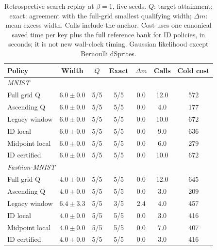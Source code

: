 \begin{table}[H]
\caption{Retrospective search replay at $\beta=1$, five seeds. $Q$: target attainment; exact: agreement with the full-grid smallest qualifying width; $\Delta m$: mean excess width. Calls include the anchor. Cost uses one canonical saved time per key plus the full reference bank for ID policies, in seconds; it is not new wall-clock timing. Gaussian likelihood except Bernoulli dSprites.}\label{tab:replay1}
\small
\setlength{\tabcolsep}{3pt}
\begin{tabular*}{\textwidth}{@{\extracolsep{\fill}}lcccccc@{}}
\toprule
Policy & Width & $Q$ & Exact & $\Delta m$ & Calls & Cold cost \\
\midrule
\multicolumn{7}{l}{\emph{MNIST}} \\
Full grid Q & $6.0 \pm 0.0$ & 5/5 & 5/5 & 0.0 & 12.0 & 572 \\
Ascending Q & $6.0 \pm 0.0$ & 5/5 & 5/5 & 0.0 & 4.0 & 177 \\
Legacy window & $6.0 \pm 0.0$ & 5/5 & 5/5 & 0.0 & 10.0 & 672 \\
ID local & $6.0 \pm 0.0$ & 5/5 & 5/5 & 0.0 & 9.0 & 636 \\
Midpoint local & $6.0 \pm 0.0$ & 5/5 & 5/5 & 0.0 & 6.0 & 279 \\
ID certified & $6.0 \pm 0.0$ & 5/5 & 5/5 & 0.0 & 10.0 & 672 \\
\midrule
\multicolumn{7}{l}{\emph{Fashion-MNIST}} \\
Full grid Q & $4.0 \pm 0.0$ & 5/5 & 5/5 & 0.0 & 12.0 & 645 \\
Ascending Q & $4.0 \pm 0.0$ & 5/5 & 5/5 & 0.0 & 3.0 & 209 \\
Legacy window & $6.4 \pm 3.3$ & 5/5 & 3/5 & 2.4 & 4.0 & 457 \\
ID local & $4.0 \pm 0.0$ & 5/5 & 5/5 & 0.0 & 3.0 & 416 \\
Midpoint local & $4.0 \pm 0.0$ & 5/5 & 5/5 & 0.0 & 7.0 & 407 \\
ID certified & $4.0 \pm 0.0$ & 5/5 & 5/5 & 0.0 & 3.0 & 416 \\
\bottomrule\end{tabular*}
\end{table}
